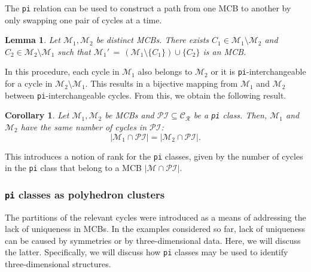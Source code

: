 \documentclass[fleqn,11pt]{article}
\newtheorem{lemma}[theorem]{Lemma}
\newtheorem{corollary}[theorem]{Corollary}
\newcommand\calM{\mathcal{M}}
\newcommand\RelCyc{\mathcal{C_R}} %
\begin{document}
The {\tt pi} relation can be used to construct a path from one MCB to another by only swapping one pair of cycles at a time. 
\begin{lemma}
	Let $\calM_1,\calM_2$ be distinct MCBs. There exists $C_1\in\calM_1\setminus\calM_2$ and $C_2\in\calM_2\setminus\calM_1$ such that $\calM_1'\,{=}\,(\calM_1\setminus\{C_1\})\cup\{C_2\}$ is an MCB.%
	\label{Lem:DICE_Irreducible}
\end{lemma}
In this procedure, each cycle in $\calM_1$ also belongs to $\calM_2$ or it is {\tt pi}-interchangeable for a cycle in $\calM_2\setminus\calM_1$. This results in a bijective mapping from $\calM_1$ and $\calM_2$ between {\tt pi}-interchangeable cycles. From this, we obtain the following result.
\begin{corollary}
	Let $\calM_1,\calM_2$ be MCBs and $\mathcal{PI}\subseteq\RelCyc$ be a {\tt pi} class. Then, $\calM_1$ and $\calM_2$ have the same number of cycles in $\mathcal{PI}$:
	\begin{equation}
		|\calM_1\cap\mathcal{PI}| = |\calM_2\cap\mathcal{PI}|.
	\end{equation}
\end{corollary}
\noindent This introduces a notion of rank for the {\tt pi} classes, given by the number of cycles in the {\tt pi} class that belong to a MCB $|\calM\cap\mathcal{PI}|$.



\subsubsection{{\tt pi} classes as polyhedron clusters}
\label{sub:Poly}




The partitions of the relevant cycles 
were introduced as a means of addressing the lack of uniqueness in MCBs. In the examples considered so far, lack of uniqueness can be caused by symmetries or by three-dimensional data. Here, we will discuss the latter. Specifically, we will discuss how {\tt pi} classes may be used to identify three-dimensional structures.
\end{document}
